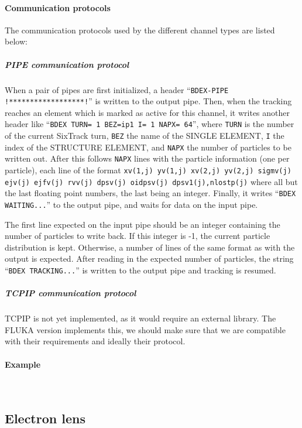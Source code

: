 \paragraph{Communication protocols}
The communication protocols used by the different channel types are listed below:
\subparagraph{PIPE communication protocol}
When a pair of pipes are first initialized, a header ``\texttt{BDEX-PIPE !******************!}'' is written to the output pipe.
Then, when the tracking reaches an element which is marked as active for this channel, it writes another header like ``\texttt{BDEX TURN= 1 BEZ=ip1 I= 1 NAPX= 64}'', where \texttt{TURN} is the number of the current SixTrack turn, \texttt{BEZ} the name of the SINGLE ELEMENT, \texttt{I} the index of the STRUCTURE ELEMENT, and \texttt{NAPX} the number of particles to be written out.
After this follows \texttt{NAPX} lines with the particle information (one per particle), each line of the format \texttt{xv(1,j) yv(1,j) xv(2,j) yv(2,j) sigmv(j) ejv(j) ejfv(j) rvv(j) dpsv(j) oidpsv(j) dpsv1(j),nlostp(j)} where all but the last floating point numbers, the last being an integer.
Finally, it writes ``\texttt{BDEX WAITING...}'' to the output pipe, and waits for data on the input pipe.

The first line expected on the input pipe should be an integer containing the number of particles to write back.
If this integer is -1, the current particle distribution is kept.
Otherwise, a number of lines of the same format as with the output is expected.
After reading in the expected number of particles, the string ``\texttt{BDEX TRACKING...}'' is written to the output pipe and tracking is resumed.

\subparagraph{TCPIP communication protocol}
TCPIP is not yet implemented, as it would require an external library.
The FLUKA version implements this, we should make sure that we are compatible with their requirements and ideally their protocol.

\paragraph{Example}~\\


\subsection{Electron lens} \label{sec:elen}

